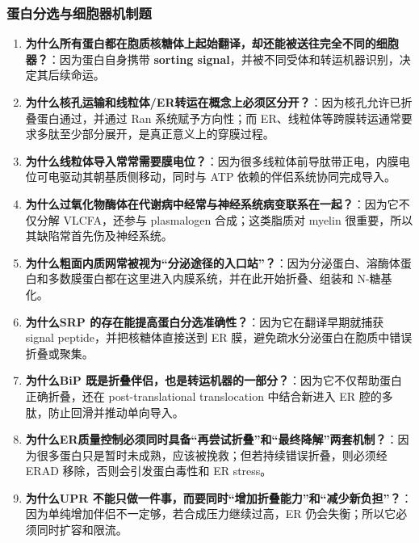 \documentclass[12pt,fontset=none]{ctexart}
\begin{document}
\subsubsection*{蛋白分选与细胞器机制题}
\begin{enumerate}
\item \textbf{为什么所有蛋白都在胞质核糖体上起始翻译，却还能被送往完全不同的细胞器？}：因为蛋白自身携带 \textbf{sorting signal}，并被不同受体和转运机器识别，决定其后续命运。

\item \textbf{为什么核孔运输和线粒体/ER转运在概念上必须区分开？}：因为核孔允许已折叠蛋白通过，并通过 Ran 系统赋予方向性；而 ER、线粒体等跨膜转运通常要求多肽至少部分展开，是真正意义上的穿膜过程。

\item \textbf{为什么线粒体导入常常需要膜电位？}：因为很多线粒体前导肽带正电，内膜电位可电驱动其朝基质侧移动，同时与 ATP 依赖的伴侣系统协同完成导入。

\item \textbf{为什么过氧化物酶体在代谢病中经常与神经系统病变联系在一起？}：因为它不仅分解 VLCFA，还参与 plasmalogen 合成；这类脂质对 myelin 很重要，所以其缺陷常首先伤及神经系统。

\item \textbf{为什么粗面内质网常被视为“分泌途径的入口站”？}：因为分泌蛋白、溶酶体蛋白和多数膜蛋白都在这里进入内膜系统，并在此开始折叠、组装和 N-糖基化。

\item \textbf{为什么SRP 的存在能提高蛋白分选准确性？}：因为它在翻译早期就捕获 signal peptide，并把核糖体直接送到 ER 膜，避免疏水分泌蛋白在胞质中错误折叠或聚集。

\item \textbf{为什么BiP 既是折叠伴侣，也是转运机器的一部分？}：因为它不仅帮助蛋白正确折叠，还在 post-translational translocation 中结合新进入 ER 腔的多肽，防止回滑并推动单向导入。

\item \textbf{为什么ER质量控制必须同时具备“再尝试折叠”和“最终降解”两套机制？}：因为很多蛋白只是暂时未成熟，应该被挽救；但若持续错误折叠，则必须经 ERAD 移除，否则会引发蛋白毒性和 ER stress。

\item \textbf{为什么UPR 不能只做一件事，而要同时“增加折叠能力”和“减少新负担”？}：因为单纯增加伴侣不一定够，若合成压力继续过高，ER 仍会失衡；所以它必须同时扩容和限流。

\end{enumerate}
\end{document}
